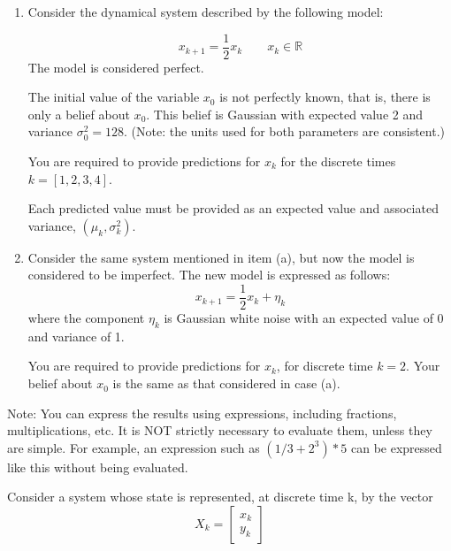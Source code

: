 \documentclass[parcial]{lcc}
\begin{document}
\begin{enumerate}

    \item Consider the dynamical system described by the following model:

    \begin{equation*}
    x_{k+1} = \frac{1}{2}x_{k} \qquad x_{k} \in \mathbb{R}
    \end{equation*}
    The model is considered perfect.

    The initial value of the variable $x_0$ is not perfectly known, that is, there is only a belief about $x_0$. This belief is Gaussian with expected value 2 and variance $\sigma^2_{0} = 128$. (Note: the units used for both parameters are consistent.)

    You are required to provide predictions for $x_k$ for the discrete times $k=[1,2,3,4]$.

    Each predicted value must be provided as an expected value and associated variance, $\left(\mu_{k}, \sigma_{k}^2\right)$.

    \item Consider the same system mentioned in item (a), but now the model is considered to be imperfect. The new model is expressed as follows:
    \begin{equation*}
    x_{k+1} = \frac{1}{2}x_k + \eta_k
    \end{equation*}
    where the component $\eta_k$ is Gaussian white noise with an expected value of 0 and variance of 1.

    You are required to provide predictions for $x_{k}$, for discrete time $k=2$. Your belief about $x_0$ is the same as that considered in case (a).

\end{enumerate}

Note: You can express the results using expressions, including fractions, multiplications, etc. It is NOT strictly necessary to evaluate them, unless they are simple. For example, an expression such as $(1/3 + 2^3)*5$ can be expressed like this without being evaluated.

\ejercicio Consider a system whose state is represented, at discrete time k, by the vector
    \begin{equation*}
    X_{k} = \begin{bmatrix}
    x_{k}\\
    y_{k}
    \end{bmatrix}
    \end{equation*}
\end{document}
